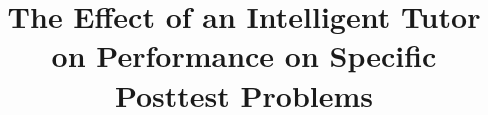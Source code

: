 \documentclass{edm_article}
\begin{document}
\title{The Effect of an Intelligent Tutor on Performance on Specific Posttest Problems}
%

\end{document}
